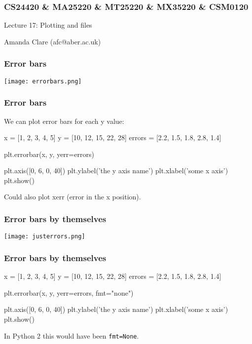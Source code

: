\documentclass{beamer}
\begin{document}
\begin{frame}
\frametitle{CS24420 \& MA25220 \& MT25220 \& MX35220 \& CSM0120}

\begin{center}
\begin{huge}
Lecture 17: Plotting and files
\end{huge}
\bigskip

Amanda Clare (afc@aber.ac.uk)

\end{center}
\end{frame}



\begin{frame}[fragile]
\frametitle{Error bars}
\texttt{[image: errorbars.png]}
\end{frame}


\begin{frame}[fragile]
\frametitle{Error bars}

We can plot error bars for each y value:

\begin{code}
x = [1, 2, 3, 4, 5]
y = [10, 12, 15, 22, 28]
errors = [2.2, 1.5, 1.8, 2.8, 1.4]

plt.errorbar(x, y, yerr=errors)

plt.axis([0, 6, 0, 40])
plt.ylabel('the y axis name')
plt.xlabel('some x axis')
plt.show()
\end{code}

Could also plot xerr (error in the x position). 
\end{frame}


\begin{frame}[fragile]
\frametitle{Error bars by themselves}
\texttt{[image: justerrors.png]}
\end{frame}


\begin{frame}[fragile]
\frametitle{Error bars by themselves}

\begin{code}
x = [1, 2, 3, 4, 5]
y = [10, 12, 15, 22, 28]
errors = [2.2, 1.5, 1.8, 2.8, 1.4]

plt.errorbar(x, y, yerr=errors, fmt="none")

plt.axis([0, 6, 0, 40])
plt.ylabel('the y axis name')
plt.xlabel('some x axis')
plt.show()
\end{code}

In Python 2 this would have been \texttt{fmt=None}.
\end{frame}
\end{document}
